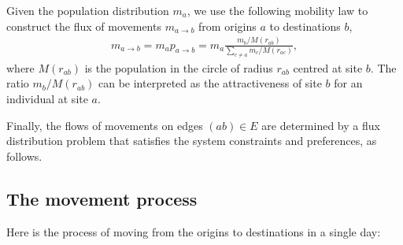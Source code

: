 \documentclass[aps,preprint]{revtex4-1}
\begin{document}
Given the population distribution $m_a$, we use the following mobility law to construct the flux of movements $m_{a\to b}$ from origins $a$ to destinations $b$, 
\begin{align}\label{mab}
m_{a\to b}=m_ap_{a\to b}=m_a\frac{m_b/M(r_{ab})}{\sum_{c\neq a} m_c/M(r_{ac})},
\end{align}
where $M(r_{ab})$ is the population in the circle of radius $r_{ab}$ centred at site $b$. The ratio $m_b/M(r_{ab})$ can be interpreted as the attractiveness of site $b$ for an individual at site $a$. 

Finally, the flows of movements on edges $(ab)\in E$ are determined by a flux distribution problem that satisfies the system constraints and preferences, as follows. 
 

\subsection{The movement process}\label{S11}
Here is the process of moving from the origins to destinations in a single day:
\end{document}
